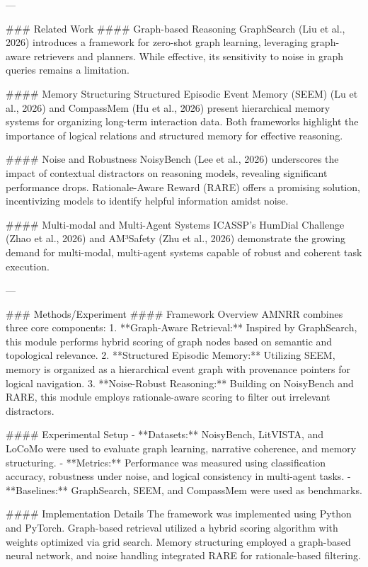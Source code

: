 ---

### Related Work  
#### Graph-based Reasoning  
GraphSearch (Liu et al., 2026) introduces a framework for zero-shot graph learning, leveraging graph-aware retrievers and planners. While effective, its sensitivity to noise in graph queries remains a limitation.  

#### Memory Structuring  
Structured Episodic Event Memory (SEEM) (Lu et al., 2026) and CompassMem (Hu et al., 2026) present hierarchical memory systems for organizing long-term interaction data. Both frameworks highlight the importance of logical relations and structured memory for effective reasoning.

#### Noise and Robustness  
NoisyBench (Lee et al., 2026) underscores the impact of contextual distractors on reasoning models, revealing significant performance drops. Rationale-Aware Reward (RARE) offers a promising solution, incentivizing models to identify helpful information amidst noise.

#### Multi-modal and Multi-Agent Systems  
ICASSP's HumDial Challenge (Zhao et al., 2026) and AM³Safety (Zhu et al., 2026) demonstrate the growing demand for multi-modal, multi-agent systems capable of robust and coherent task execution.

---

### Methods/Experiment  
#### Framework Overview  
AMNRR combines three core components:  
1. **Graph-Aware Retrieval:** Inspired by GraphSearch, this module performs hybrid scoring of graph nodes based on semantic and topological relevance.  
2. **Structured Episodic Memory:** Utilizing SEEM, memory is organized as a hierarchical event graph with provenance pointers for logical navigation.  
3. **Noise-Robust Reasoning:** Building on NoisyBench and RARE, this module employs rationale-aware scoring to filter out irrelevant distractors.  

#### Experimental Setup  
- **Datasets:** NoisyBench, LitVISTA, and LoCoMo were used to evaluate graph learning, narrative coherence, and memory structuring.  
- **Metrics:** Performance was measured using classification accuracy, robustness under noise, and logical consistency in multi-agent tasks.  
- **Baselines:** GraphSearch, SEEM, and CompassMem were used as benchmarks.  

#### Implementation Details  
The framework was implemented using Python and PyTorch. Graph-based retrieval utilized a hybrid scoring algorithm with weights optimized via grid search. Memory structuring employed a graph-based neural network, and noise handling integrated RARE for rationale-based filtering.

